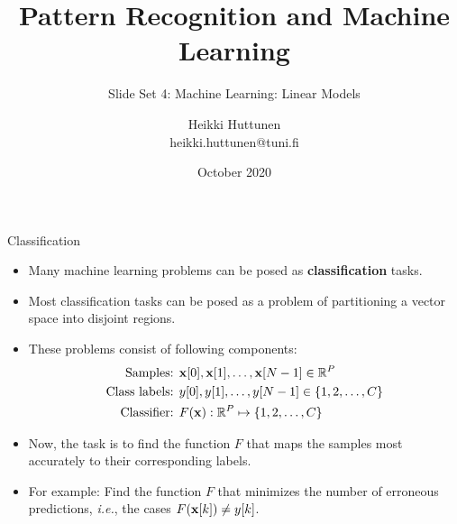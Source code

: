 \documentclass[10pt, aspectratio=169]{beamer} %
\title{Pattern Recognition and Machine Learning}
\subtitle{Slide Set 4: Machine Learning: Linear Models}
\author{Heikki Huttunen\\
heikki.huttunen@tuni.fi}
\institute{Signal Processing\\Tampere University}
\date{October 2020}
\newcommand{\R}{{\mathbb{R}}}
\newcommand{\x}{{\bf x}}
\begin{document}
\maketitle


\lstset{language=Python,style=mystyle} 


\begin{frame}{Classification}
\begin{itemize}
\item Many machine learning problems can be posed as \textbf{classification} tasks.
\item Most classification tasks can be posed as a problem of partitioning a vector space into disjoint regions.
\item These problems consist of following components:
\begin{align*}
\text{Samples: } & \x[0],\x[1],\ldots,\x[N-1] \in \R^P\\
\text{Class labels: } & y[0],y[1],\ldots,y[N-1] \in \{1,2,\ldots, C\}\\
\text{Classifier: } & F(\x): \R^P \mapsto \{1,2,\ldots, C\}
\end{align*}
\item Now, the task is to find the function $F$ that maps the samples most 
accurately to their corresponding labels.
\item For example: Find the function $F$ that minimizes the number 
of erroneous predictions, \emph{i.e.}, the cases  $F(\x[k]) \ne y[k]$.
\end{itemize}
\end{frame}
\end{document}

